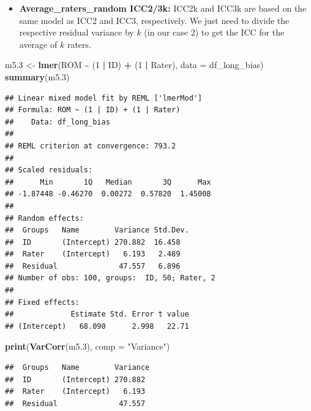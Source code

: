 \documentclass[
]{book}
\newenvironment{Shaded}{\begin{snugshade}}{\end{snugshade}}
\newcommand{\AttributeTok}[1]{\textcolor[rgb]{0.13,0.29,0.53}{#1}}
\newcommand{\DecValTok}[1]{\textcolor[rgb]{0.00,0.00,0.81}{#1}}
\newcommand{\FloatTok}[1]{\textcolor[rgb]{0.00,0.00,0.81}{#1}}
\newcommand{\FunctionTok}[1]{\textcolor[rgb]{0.13,0.29,0.53}{\textbf{#1}}}
\newcommand{\NormalTok}[1]{#1}
\newcommand{\OtherTok}[1]{\textcolor[rgb]{0.56,0.35,0.01}{#1}}
\newcommand{\SpecialCharTok}[1]{\textcolor[rgb]{0.81,0.36,0.00}{\textbf{#1}}}
\newcommand{\StringTok}[1]{\textcolor[rgb]{0.31,0.60,0.02}{#1}}
\providecommand{\tightlist}{%
  \setlength{\itemsep}{0pt}\setlength{\parskip}{0pt}}
\begin{document}
\begin{itemize}
\tightlist
\item
  \textbf{Average\_raters\_random ICC2/3k:}
  ICC2k and ICC3k are based on the same model as ICC2 and ICC3, respectively.
  We just need to divide the respective residual variance by \(k\) (in our case 2) to get
  the ICC for the average of \(k\) raters.
\end{itemize}

\begin{Shaded}
\begin{Highlighting}[]
\NormalTok{m5}\FloatTok{.3} \OtherTok{\textless{}{-}} \FunctionTok{lmer}\NormalTok{(ROM }\SpecialCharTok{\textasciitilde{}}\NormalTok{ (}\DecValTok{1} \SpecialCharTok{|}\NormalTok{ ID) }\SpecialCharTok{+}\NormalTok{ (}\DecValTok{1} \SpecialCharTok{|}\NormalTok{ Rater), }\AttributeTok{data =}\NormalTok{ df\_long\_bias)}
\FunctionTok{summary}\NormalTok{(m5}\FloatTok{.3}\NormalTok{)}
\end{Highlighting}
\end{Shaded}

\begin{verbatim}
## Linear mixed model fit by REML ['lmerMod']
## Formula: ROM ~ (1 | ID) + (1 | Rater)
##    Data: df_long_bias
## 
## REML criterion at convergence: 793.2
## 
## Scaled residuals: 
##      Min       1Q   Median       3Q      Max 
## -1.87448 -0.46270  0.00272  0.57820  1.45008 
## 
## Random effects:
##  Groups   Name        Variance Std.Dev.
##  ID       (Intercept) 270.882  16.458  
##  Rater    (Intercept)   6.193   2.489  
##  Residual              47.557   6.896  
## Number of obs: 100, groups:  ID, 50; Rater, 2
## 
## Fixed effects:
##             Estimate Std. Error t value
## (Intercept)   68.090      2.998   22.71
\end{verbatim}

\begin{Shaded}
\begin{Highlighting}[]
\FunctionTok{print}\NormalTok{(}\FunctionTok{VarCorr}\NormalTok{(m5}\FloatTok{.3}\NormalTok{), }\AttributeTok{comp =} \StringTok{"Variance"}\NormalTok{)}
\end{Highlighting}
\end{Shaded}

\begin{verbatim}
##  Groups   Name        Variance
##  ID       (Intercept) 270.882 
##  Rater    (Intercept)   6.193 
##  Residual              47.557
\end{verbatim}
\end{document}
